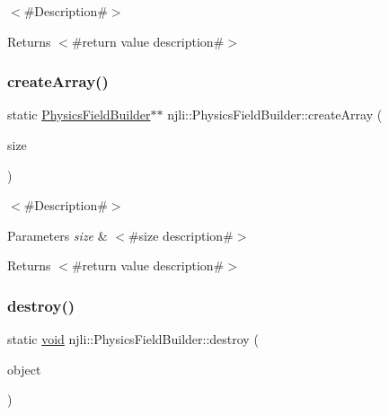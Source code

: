 $<$\#\+Description\#$>$

\begin{DoxyReturn}{Returns}
$<$\#return value description\#$>$ 
\end{DoxyReturn}
\mbox{\label{classnjli_1_1_physics_field_builder_aa1e7294df124723f5eaf563c58430d2d}} 
\subsubsection{\texorpdfstring{create\+Array()}{createArray()}}
{\footnotesize\ttfamily static \mbox{\hyperlink{classnjli_1_1_physics_field_builder}{Physics\+Field\+Builder}}$\ast$$\ast$ njli\+::\+Physics\+Field\+Builder\+::create\+Array (\begin{DoxyParamCaption}\item[{const \mbox{\hyperlink{_util_8h_a10e94b422ef0c20dcdec20d31a1f5049}{u32}}}]{size }\end{DoxyParamCaption})\hspace{0.3cm}{\ttfamily [static]}}

$<$\#\+Description\#$>$


\begin{DoxyParams}{Parameters}
{\em size} & $<$\#size description\#$>$\\
\hline
\end{DoxyParams}
\begin{DoxyReturn}{Returns}
$<$\#return value description\#$>$ 
\end{DoxyReturn}
\mbox{\label{classnjli_1_1_physics_field_builder_a533642614f2f7ce25456722a0ecf7fac}} 
\subsubsection{\texorpdfstring{destroy()}{destroy()}}
{\footnotesize\ttfamily static \mbox{\hyperlink{_thread_8h_af1e856da2e658414cb2456cb6f7ebc66}{void}} njli\+::\+Physics\+Field\+Builder\+::destroy (\begin{DoxyParamCaption}\item[{\mbox{\hyperlink{classnjli_1_1_physics_field_builder}{Physics\+Field\+Builder}} $\ast$}]{object }\end{DoxyParamCaption})\hspace{0.3cm}{\ttfamily [static]}}

